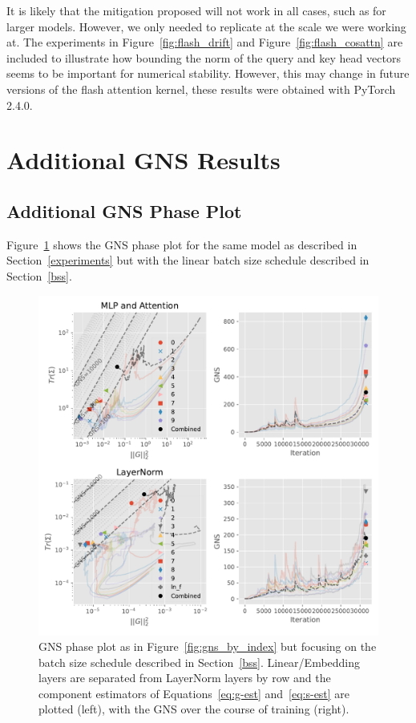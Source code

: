 \documentclass{article}
\begin{document}
It is likely that the mitigation proposed will not work in all cases, such
as for larger models. However, we only needed to replicate at the scale we
were working at. The experiments in Figure~\ref{fig:flash_drift} and
Figure~\ref{fig:flash_cosattn} are included to illustrate how bounding the norm
of the query and key head vectors seems to be important for numerical stability.
However, this may change in future versions of the flash attention kernel, these
results were obtained with PyTorch 2.4.0.

\section{Additional GNS Results}\label{app-allgns}

\subsection{Additional GNS Phase Plot}\label{app-gns}

Figure~\ref{fig:gns_by_index_bss} shows the GNS phase plot for the same model
as described in Section~\ref{experiments} but with the linear batch size schedule
described in Section~\ref{bss}.

\begin{figure}
    \centering
    \includegraphics[width=\textwidth]{output_figures/gns_vs_trace_bss.layer_idx.pdf}
    \caption{%
        GNS phase plot as in Figure~\ref{fig:gns_by_index} but focusing on the
        batch size schedule described in Section~\ref{bss}. Linear/Embedding
        layers are separated from LayerNorm layers by row and the component
        estimators of Equations~\ref{eq:g-est} and~\ref{eq:s-est} are plotted
        (left), with the GNS over the course of training (right).}
    \label{fig:gns_by_index_bss}
\end{figure}
\end{document}
